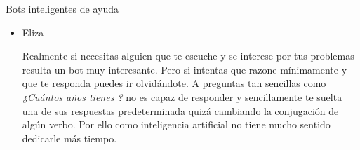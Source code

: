 \documentclass[spanish, a4paper, 12pt]{article} 	%
\begin{document}
\begin{section}{Bots inteligentes de ayuda}
\begin{itemize}
		Realmente de las cuatro es la única que puede considerarse inteligencia artificial.
		\item{Eliza}
		
	Realmente si necesitas alguien que te escuche y se interese por tus problemas resulta un bot muy interesante. Pero si intentas que razone mínimamente y que te responda puedes ir olvidándote. A preguntas tan sencillas como  \textit{¿Cuántos años tienes ?} no es capaz de responder y sencillamente te suelta una de sus respuestas predeterminada quizá cambiando la conjugación de algún verbo. Por ello como inteligencia artificial no tiene mucho sentido dedicarle más tiempo.
	
	\end{itemize}
\end{section}
\end{document}
